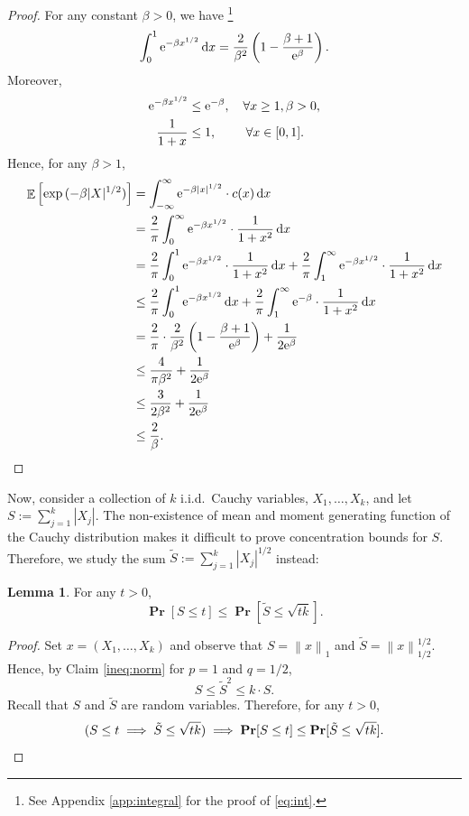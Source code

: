 \documentclass[10pt,a4paper,twoside]{book}
\newcommand{\dx}{\,\mathrm{d} x}
\newcommand{\ex}{{\rm e}}
\newcommand{\norm}[1]{\left \rVert {#1} \right \rVert}
\DeclareMathOperator*{\prob}{\mathbf{Pr}}
\DeclareMathOperator*{\EE}{\mathbb{E}}
\theoremstyle{definition}
\newtheorem{lemma}[definition]{Lemma}
\theoremstyle{remark}
\begin{document}
\begin{proof}
For any constant $\beta>0$, we have \footnote{See Appendix \ref{app:integral} for the proof of \eqref{eq:int}.}
\begin{equation} \label{eq:int}
    \int_{0}^{1} \ex^{-\beta x^{1/2}} \dx = \frac{2}{\beta^2}\left(1 - \frac{\beta + 1}{\ex ^{\beta}} \right).
\end{equation}
Moreover,
\begin{align*}
    \ex^{-\beta x^{1/2}} &\leq \ex^{-\beta}, \quad \forall x \geq 1, \beta>0, \\
    \frac{1}{1+x} &\leq 1, \quad \quad \ \forall x \in [0,1].
\end{align*}
Hence, for any $\beta > 1$,
\begin{align*}
    \EE \left[ \exp{(-\beta |X|^{1/2})} \right] &= \int_{-\infty}^{\infty} \ex^{-\beta |x|^{1/2}} \cdot c(x) \dx  \\
    &=  \frac{2}{\pi} \int_{0}^{\infty} \ex^{-\beta x^{1/2}} \cdot \frac{1}{1+x^2} \dx \\
    &=  \frac{2}{\pi} \int_{0}^{1} \ex^{-\beta x^{1/2}} \cdot \frac{1}{1+x^2} \dx + \frac{2}{\pi} \int_{1}^{\infty} \ex^{-\beta x^{1/2}} \cdot \frac{1}{1+x^2} \dx  \\
    &\leq \frac{2}{\pi} \int_{0}^{1} \ex^{-\beta x^{1/2}} \dx + \frac{2}{\pi} \int_{1}^{\infty} \ex^{-\beta} \cdot \frac{1}{1+x^2} \dx \\
    &= \frac{2}{\pi} \cdot \frac{2}{\beta^2}\left(1 - \frac{\beta + 1}{\ex ^{\beta}} \right) +  \frac{1}{2\ex^{\beta}} \\
    &\leq  \frac{4}{\pi \beta^2}+\frac{1}{2\ex^{\beta}} \\
    &\leq  \frac{3}{2 \beta^2}+\frac{1}{2\ex^{\beta}} \\
    &\leq \frac{2}{\beta} . \qedhere
\end{align*}
\end{proof}
Now, consider a collection of $k$ i.i.d.\ Cauchy variables, $X_1,\ldots,X_k$, and let $S := \sum_{j=1}^k |X_j|$. The non-existence of mean and moment generating function of the Cauchy distribution makes it difficult to prove concentration bounds for $S$. Therefore, we study the sum $\tilde{S} := \sum_{j=1}^k |X_j|^{1/2}$ instead:

\begin{lemma} \label{lemma:normineq}
For any $t>0$,
\[ \prob[S \leq t] \leq \prob[\tilde{S} \leq \sqrt{tk}]. \]
\end{lemma}
\begin{proof}
Set $x = (X_1, \ldots, X_k)$ and observe that $S = \norm{x}_1$ and $\tilde{S} = \norm{x}_{1/2}^{1/2}$. Hence, by Claim \ref{ineq:norm} for $p=1$ and $q=1/2$,
\[ S \leq \tilde{S}^2 \leq k \cdot S. \]
Recall that $S$ and $\tilde{S}$ are random variables. Therefore, for any $t>0$, 
\[ ( S \leq t \implies \tilde{S} \leq \sqrt{tk}) \implies \prob[S \leq t] \leq \prob[\tilde{S} \leq \sqrt{tk}]. \qedhere\]
\end{proof}
\end{document}
